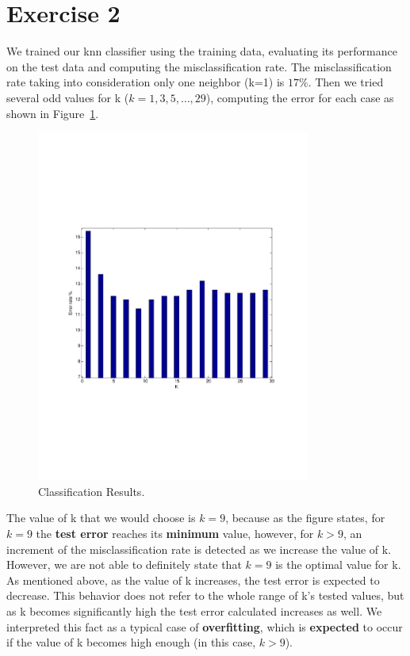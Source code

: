 \documentclass[letterpaper,11pt]{article}
\begin{document}
\section*{Exercise 2}
We trained our knn classifier using the training data, evaluating its performance on the test data and computing the misclassification rate. The misclassification rate taking into consideration only one neighbor (k=1) is $17\%$. Then we tried several odd values for k ($k=1, 3, 5, \ldots, 29$), computing the error for each case as shown in Figure~\ref{fig:3}.


  \begin{figure}[h!]
\centering
  \includegraphics[trim = 0cm 7cm 0cm 7cm, clip, width=0.8\textwidth]{figures/KnnResults.pdf}
  \caption{Classification Results.}
  \label{fig:3}
\end{figure}

The value of k that we would choose is \textbf{$k=9$}, because as the figure states, for $k=9$ the \textbf{test error} reaches its \textbf{minimum} value, however, for $k>9$, an increment of the misclassification rate is detected as we increase the value of k. However, we are not able to definitely state that $k=9$ is the optimal value for k. As mentioned above, as the value of k increases, the test error is expected to decrease. This behavior does not refer to the whole range of k's tested values, but as k becomes significantly high the test error calculated increases as well. We interpreted this fact as a typical case of \textbf{overfitting}, which is \textbf{expected} to occur if the value of k becomes high enough (in this case, $k>9$).
\end{document}
